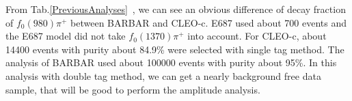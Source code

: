From Tab.\ref{PreviousAnalyses}~\cite{2011BARBAR}, we can see an obvious difference of decay fraction of $f_{0}(980)\pi^{+}$ between BARBAR and CLEO-c. E687 used about 700 events and the E687 model did not take $f_{0}(1370)\pi^{+}$ into account. For CLEO-c, about 14400 events with purity about 84.9\% were selected with single tag method. The analysis of BARBAR used about 100000 events with purity about 95\%. In this analysis with double tag method, we can get a nearly background free data sample, that will be good to perform the amplitude analysis.

\iffalse
As shown in Figure~\ref{fig:lambc_cs} and Figure~\ref{fig:lambc_cs_bes3}, at the energy of 4.6\,GeV, cross section of producing $\lambdacp\lambdacm$ pair in $\ee$ collisions is $\sigma(\ee\to\lambdacp\lambdacm)=0.38\pm0.13\,\rm{nb}$ measured by BELLE~\cite{Pakhlova:2008vn} and $\sigma(\ee\to\lambdacp\lambdacm)=0.253\pm0.023\,\rm{nb}$ measured by BESIII~\cite{Weiping:lineshape}.\\



\begin{figure*}[h]
\centering
\texttt{[image: bes3\_lineshape.eps]}
\caption{Cross sections of $\ee\to\lambdacp\lambdacm$ measured by BESIII.}
\label{fig:lambc_cs_bes3}
\end{figure*}
\fi
